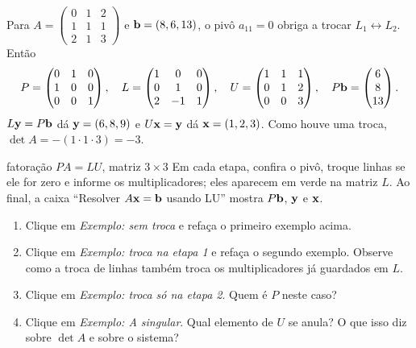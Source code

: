 \begin{exemplo}[: fatoração com troca ($PA=LU$)]
Para $A=\begin{pmatrix}0&1&2\\1&1&1\\2&1&3\end{pmatrix}$ e $\mathbf{b}=(8,6,13)$, o pivô
$a_{11}=0$ obriga a trocar $L_1\leftrightarrow L_2$. Então
\[
P=\begin{pmatrix}0&1&0\\1&0&0\\0&0&1\end{pmatrix},\quad
L=\begin{pmatrix}1&0&0\\0&1&0\\2&-1&1\end{pmatrix},\quad
U=\begin{pmatrix}1&1&1\\0&1&2\\0&0&3\end{pmatrix},\quad
P\mathbf{b}=\begin{pmatrix}6\\8\\13\end{pmatrix}.
\]
$L\mathbf{y}=P\mathbf{b}$ dá $\mathbf{y}=(6,8,9)$ e $U\mathbf{x}=\mathbf{y}$ dá $\mathbf{x}=(1,2,3)$. Como houve uma troca,
$\det A=-(1\cdot1\cdot3)=-3$.
\end{exemplo}

\begin{atividade}{fatoração $PA=LU$, matriz $3\times3$}{\arqLUtres}
Em cada etapa, confira o pivô, troque linhas se ele for zero e informe os multiplicadores; eles
aparecem em verde na matriz $L$. Ao final, a caixa ``Resolver $A\mathbf{x}=\mathbf{b}$ usando LU'' mostra
$P\mathbf{b}$, $\mathbf{y}$ e $\mathbf{x}$.
\begin{enumerate}[nosep]
  \item Clique em \emph{Exemplo: sem troca} e refaça o primeiro exemplo acima.
  \item Clique em \emph{Exemplo: troca na etapa 1} e refaça o segundo exemplo. Observe como a
        troca de linhas também troca os multiplicadores já guardados em $L$.
  \item Clique em \emph{Exemplo: troca só na etapa 2}. Quem é $P$ neste caso?
  \item Clique em \emph{Exemplo: A singular}. Qual elemento de $U$ se anula? O que isso diz
        sobre $\det A$ e sobre o sistema?
\end{enumerate}
\end{atividade}

